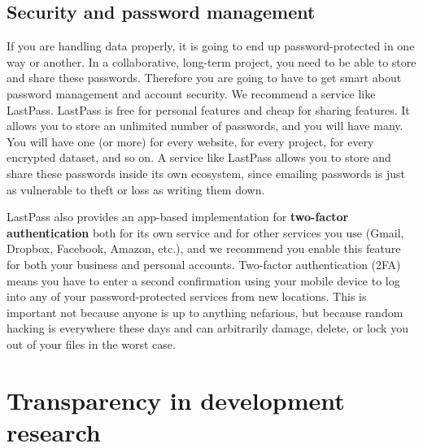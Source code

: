 \subsection{Security and password management}

If you are handling data properly, it is going to end up password-protected in one way or another.
In a collaborative, long-term project, you need to be able to store and share these passwords.
Therefore you are going to have to get smart about password management and account security.
We recommend a service like LastPass.
LastPass is free for personal features and cheap for sharing features.
It allows you to store an unlimited number of passwords, and you will have many.
You will have one (or more) for every website, for every project, for every encrypted dataset, and so on.
A service like LastPass allows you to store and share these passwords inside its own ecosystem,
since emailing passwords is just as vulnerable to theft or loss as writing them down.

LastPass also provides an app-based implementation for \textbf{two-factor authentication}
both for its own service and for other services you use (Gmail, Dropbox, Facebook, Amazon, etc.),
and we recommend you enable this feature for both your business and personal accounts.
Two-factor authentication (2FA) means you have to enter a second confirmation using your mobile device
to log into any of your password-protected services from new locations.
This is important not because anyone is up to anything nefarious,
but because random hacking is everywhere these days
and can arbitrarily damage, delete, or lock you out of your files in the worst case.


\section{Transparency in development research}

